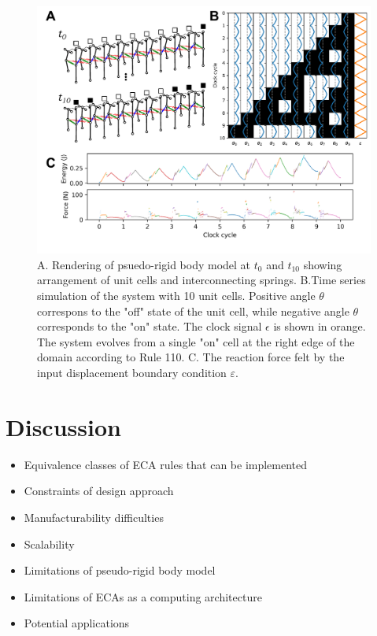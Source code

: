 \begin{figure}[H]
    \centering
    \includegraphics[width=\textwidth]{images/SVGs/Simulation.pdf}
    \caption{A. Rendering of psuedo-rigid body model at \(t_0\) and \(t_{10}\) showing arrangement of unit cells and interconnecting springs. B.Time series simulation of the system with 10 unit cells. Positive angle \(\theta\) correspons to the "off" state of the unit cell, while negative angle \(\theta\) corresponds to the "on" state. The clock signal \(\epsilon\) is shown in orange. The system evolves from a single "on" cell at the right edge of the domain according to Rule 110. C. The reaction force felt by the input displacement boundary condition \(\varepsilon\).}
    \label{fig:Simulation}
\end{figure}


\section{Discussion}

\begin{itemize}
    \item Equivalence classes of ECA rules that can be implemented
    \item Constraints of design approach
    \item Manufacturability difficulties
    \item Scalability
    \item Limitations of pseudo-rigid body model
    \item Limitations of ECAs as a computing architecture
    \item Potential applications

\end{itemize}
